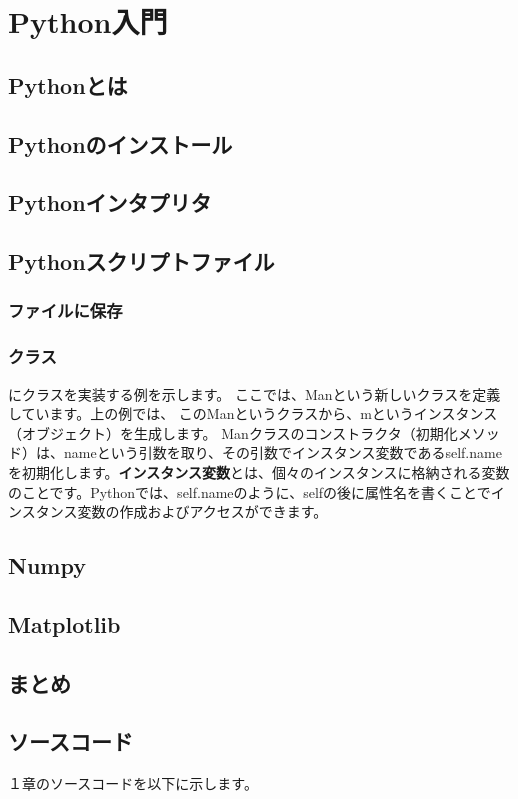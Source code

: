 \section{Python入門}
\subsection{Pythonとは}

\subsection{Pythonのインストール}

\subsection{Pythonインタプリタ}

\subsection{Pythonスクリプトファイル}
\subsubsection{ファイルに保存}

\subsubsection{クラス}
にクラスを実装する例を示します。
ここでは、Manという新しいクラスを定義しています。上の例では、
このManというクラスから、mというインスタンス（オブジェクト）を生成します。
Manクラスのコンストラクタ（初期化メソッド）は、nameという引数を取り、その引数でインスタンス変数であるself.nameを初期化します。\textbf{インスタンス変数}とは、個々のインスタンスに格納される変数のことです。Pythonでは、self.nameのように、selfの後に属性名を書くことでインスタンス変数の作成およびアクセスができます。

\subsection{Numpy}

\subsection{Matplotlib}

\subsection{まとめ}

\subsection{ソースコード}
１章のソースコードを以下に示します。

